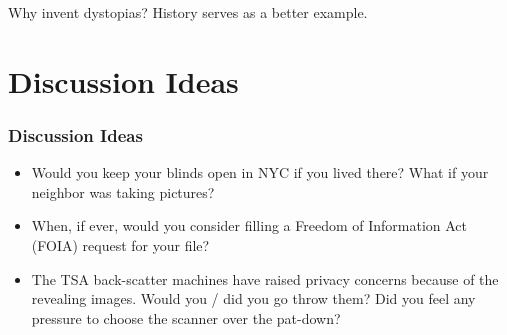 \documentclass{beamer}
\begin{document}
\begin{frame}
\begin{columns}[c]
\begin{figure}
    \end{figure}

    \end{columns}

\begin{block}{Why invent dystopias?}
      History serves as a better example.
\end{block}


\end{frame}


\section{Discussion Ideas}

\begin{frame}
\frametitle{Discussion Ideas}

\begin{itemize}
\item Would you keep your blinds open in NYC if you lived there?  What
  if your neighbor was taking pictures?
\item When, if ever, would you consider filling a Freedom of
  Information Act (FOIA) request for your file?
\item The TSA back-scatter machines have raised privacy concerns
  because of the revealing images.  Would you / did you go throw them?
  Did you feel any pressure to choose the scanner over the pat-down?

\end{itemize}

\end{frame}
\end{document}
